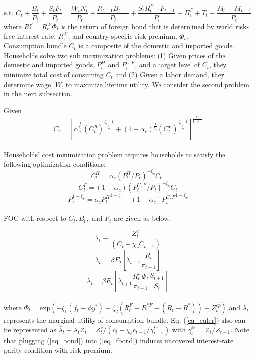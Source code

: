 \documentclass[11pt,titlepage]{article}
\begin{document}
 \begin{displaymath}  \text{s.t. }C_t  + \frac{B_t}{P_t} + \frac{S_t F_t}{P_t}= \frac{W_t N_t}{P_t} + \frac{R_{t-1}B_{t-1}} {P_t} + \frac{S_t R_{t-1}^F F_{t-1}} {P_t} + \Pi_t^F + T_t - \frac{M_t - M_{t-1}}{P_t} \end{displaymath}
where $R_t^F = R_t^W \Phi_t $ is the return of foreign bond that is determined by world risk-free interest rate, $R_t^W$, and country-specific risk premium, $\Phi_t$. \\

Consumption bundle $C_t$ is a  composite of the domestic and imported goods. Households solve two sub maximization problems: (1) Given prices of the demestic and imported goods, $P_t^H$ and $P_t^{C,F}$, and a target level of $C_t$, they minimize total cost of consuming $C_t$ and (2) Given a labor demand, they determine wage, $W$, to maximize lifetime utility. We consider the second problem in the next subsection.


Given
\[C_t = \left[\alpha_c^{\frac{1}{\xi_c}} (C_t^H)^{\frac{\xi_c-1}{\xi_c}} +(1-\alpha_c)^{\frac{1}{\xi_c}} (C_t^F)^{\frac{\xi_c-1}{\xi_c}}  \right]^{\frac{\xi_c}{\xi_c-1}} \] \\
Households' cost minimization problem requires households to satisfy the following optimization conditions:\\
\begin{equation}
C_t^H = \alpha_c\left(P_t^H/P_t\right)^{-\xi_c}C_t,
\end{equation}
\begin{equation}C_t^F = (1-\alpha_c)\left(P_t^{C,F}/P_t\right)^{-\xi_c}C_t \end{equation}
\begin{equation}P_t^{1-\xi_c} = \alpha_c {P_t^{H}}^{{1-\xi_c}}+(1-\alpha_c) {P_t^{C,F}}^{{1-\xi_c}} \end{equation} \\

FOC with respect to $C_t, B_t, \text{ and } F_t$ are given as below.

\begin{equation}
\lambda_t = \frac{Z_t^c}{(C_t-\chi_c C_{t-1})}
\label{eq_euler}\end{equation}
\begin{equation}
\lambda_t = \beta E_t \left[ \lambda_{t+1} \frac{R_t}{\pi_{t+1}} \right]
\label{eq_bond}\end{equation}
\begin{equation}
\lambda_t = \beta E_t \left[ \lambda_{t+1} \frac{R_t^w \Phi_t}{\pi_{t+1}} \frac{S_{t+1}}{S_t} \right]
\label{eq_fbond}\end{equation}\\
where $\Phi_t = \text{exp}(-\zeta_1 (f_t-\phi y^*)-\zeta_2(R_t^F-R^{*F} - (R_t - R^*))  + Z_t^{cp})$ and $\lambda_t$ represents the marginal utility of consumption bundle. Eq. (\ref{eq_euler}) also can be represented as $\bar{\lambda}_t \equiv {\lambda}_t Z_t = Z_t^c/(c_t-\chi_c c_{t-1}/\gamma_{t-1}^{tr})$ with $\gamma_{t}^{tr} = Z_t/Z_{t-1}$. Note that plugging (\ref{eq_bond}) into (\ref{eq_fbond}) induces uncovered interest-rate parity condition with risk premium. \\
\end{document}

